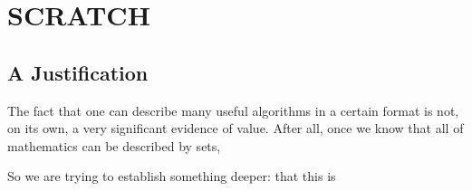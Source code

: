 \documentclass{article} %
\theoremstyle{plain}
\theoremstyle{definition}
\theoremstyle{remark}
\begin{document}
\section{SCRATCH}

\subsection{A Justification}
The fact that one can describe many useful algorithms in a certain format is not, on its own, a very significant evidence of value. 
After all, once we know that all of mathematics can be described by sets, 

So we are trying to establish something deeper: that this is 
 
\end{document}
